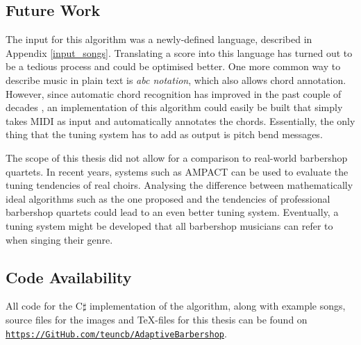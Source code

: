 \documentclass[a4paper]{article}
\begin{document}
\subsection{Future Work}
The input for this algorithm was a newly-defined language, described in Appendix \ref{input_songs}. Translating a score into this language has turned out to be a tedious process and could be optimised better. One more common way to describe music in plain text is \textit{abc notation}, which also allows chord annotation. \cite{walshaw_abc2mtex_1997} However, since automatic chord recognition has improved in the past couple of decades \cite{burgoyne_cross-validated_2007}, an implementation of this algorithm could easily be built that simply takes MIDI as input and automatically annotates the chords. Essentially, the only thing that the tuning system has to add as output is pitch bend messages.

The scope of this thesis did not allow for a comparison to real-world barbershop quartets. In recent years, systems such as AMPACT can be used to evaluate the tuning tendencies of real choirs. \cite{devaney_study_2012, chandna_deep-learning_2022} Analysing the difference between mathematically ideal algorithms such as the one proposed and the tendencies of professional barbershop quartets could lead to an even better tuning system. Eventually, a tuning system might be developed that all barbershop musicians can refer to when singing their genre.

\subsection{Code Availability}
All code for the C$\sharp$ implementation of the algorithm, along with example songs, source files for the images and \TeX-files for this thesis can be found on \texttt{\url{https://GitHub.com/teuncb/AdaptiveBarbershop}}.

% 
% 
\printbibliography
\end{document}
